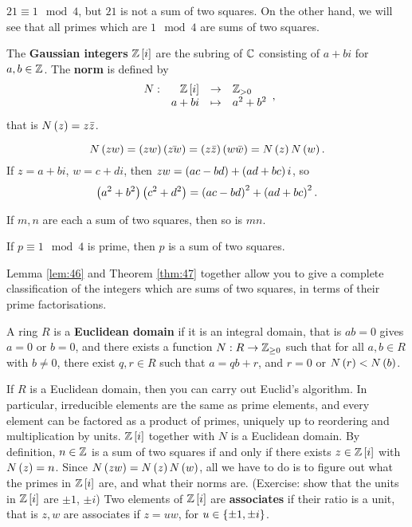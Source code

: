 \begin{example*}
$ 21 \equiv 1 \mod 4 $, but $ 21 $ is not a sum of two squares. On the other hand, we will see that all primes which are $ 1 \mod 4 $ are sums of two squares.
\end{example*}

\begin{definition}
The \textbf{Gaussian integers} $ \mathbb{Z}\left[ i \right] $ are the subring of $ \mathbb{C} $ consisting of $ a + bi $ for $ a, b \in \mathbb{Z} $. The \textbf{norm} is defined by
$$ \function[N]{\Z\sb{i}}{\Z_{> 0}}{a + bi}{a^2 + b^2}, $$
that is $ N\left( z \right) = z\bar{z} $.
\end{definition}

$$ N\left( zw \right) = \left( zw \right)\left( \bar{zw} \right) = \left( z\bar{z} \right)\left( w\bar{w} \right) = N\left( z \right)N\left( w \right). $$
If $ z = a + bi $, $ w = c + di $, then $ zw = \left( ac - bd \right) + \left( ad + bc \right)i $, so
$$ \left( a^2 + b^2 \right)\left( c^2 + d^2 \right) = \left( ac - bd \right)^2 + \left( ad + bc \right)^2. $$

\begin{lemma}
\label{lem:46}
If $ m, n $ are each a sum of two squares, then so is $ mn $.
\end{lemma}

\begin{theorem}
\label{thm:47}
If $ p \equiv 1 \mod 4 $ is prime, then $ p $ is a sum of two squares.
\end{theorem}

Lemma \ref{lem:46} and Theorem \ref{thm:47} together allow you to give a complete classification of the integers which are sums of two squares, in terms of their prime factorisations.

\begin{definition}
A ring $ R $ is a \textbf{Euclidean domain} if it is an integral domain, that is $ ab = 0 $ gives $ a = 0 $ or $ b = 0 $, and there exists a function $ N : R \to \mathbb{Z}_{\ge 0} $ such that for all $ a, b \in R $ with $ b \ne 0 $, there exist $ q, r \in R $ such that $ a = qb + r $, and $ r = 0 $ or $ N\left( r \right) < N\left( b \right) $.
\end{definition}

If $ R $ is a Euclidean domain, then you can carry out Euclid's algorithm. In particular, irreducible elements are the same as prime elements, and every element can be factored as a product of primes, uniquely up to reordering and multiplication by units. $ \mathbb{Z}\left[ i \right] $ together with $ N $ is a Euclidean domain. By definition, $ n \in \mathbb{Z} $ is a sum of two squares if and only if there exists $ z \in \mathbb{Z}\left[ i \right] $ with $ N\left( z \right) = n $. Since $ N\left( zw \right) = N\left( z \right)N\left( w \right) $, all we have to do is to figure out what the primes in $ \mathbb{Z}\left[ i \right] $ are, and what their norms are. (Exercise: show that the units in $ \mathbb{Z}\left[ i \right] $ are $ \pm 1 $, $ \pm i $) Two elements of $ \mathbb{Z}\left[ i \right] $ are \textbf{associates} if their ratio is a unit, that is $ z, w $ are associates if $ z = uw $, for $ u \in \left\{ \pm 1, \pm i \right\} $.


